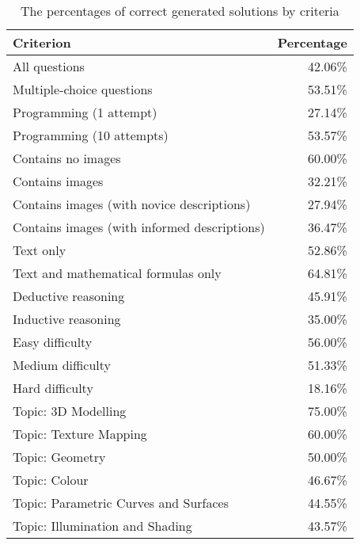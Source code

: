 \documentclass[sigconf,review]{acmart}
\begin{document}
\begin{table}
    \centering
    \caption{The percentages of correct generated solutions by criteria}
    \label{Percentage}
    \begin{tabular}{|l|r|}
    \hline
        \multicolumn{1}{|p{6cm}|}{Criterion} & Percentage \\ \hline
        \hline
        All questions & 42.06\% \\ \hline
        \hline
        Multiple-choice questions & 53.51\% \\ \hline
        Programming (1 attempt)& 27.14\% \\ \hline
        Programming (10 attempts) & 53.57\% \\ \hline
        \hline
        Contains no images & 60.00\% \\ \hline
        Contains images & 32.21\% \\ \hline
        Contains images (with novice descriptions) & 27.94\% \\ \hline
        Contains images (with informed descriptions) & 36.47\% \\ \hline
        \hline
        Text only & 52.86\% \\ \hline
        Text and mathematical formulas only & 64.81\% \\ \hline
        \hline
        Deductive reasoning & 45.91\% \\ \hline
        Inductive reasoning & 35.00\% \\ \hline
        \hline
        Easy difficulty & 56.00\% \\ \hline
        Medium difficulty & 51.33\% \\ \hline
        Hard difficulty & 18.16\% \\ \hline
        \hline
        Topic: 3D Modelling & 75.00\% \\ \hline
        Topic: Texture Mapping & 60.00\% \\ \hline
        Topic: Geometry & 50.00\% \\ \hline
        Topic: Colour & 46.67\% \\ \hline
        Topic: Parametric Curves and Surfaces & 44.55\% \\ \hline
        Topic: Illumination and Shading & 43.57\% \\ \hline

\end{tabular}
\end{table}
\end{document}
